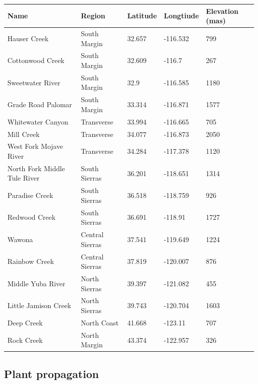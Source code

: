 \documentclass[11pt, oneside]{article}
\begin{document}
\begin{table}[ht]
   \centering
   \begin{tabular}{@{} lllll @{}}
      \toprule
  Name& Region  & Latitude  & Longtiude  & Elevation (mas) \\
      \midrule
	Hauser Creek & South Margin & 32.657	& 
    -116.532	& 799   \\
	Cottonwood Creek	& South Margin & 32.609 & 
    -116.7	& 267   \\
	Sweetwater River	& South Margin & 32.9 & 
    -116.585	& 1180   \\
	Grade Road Palomar & South Margin & 33.314 &
    -116.871	& 1577   \\
	Whitewater Canyon &	Transverse & 33.994 & 
    -116.665	& 705   \\
	Mill Creek	& Transverse & 34.077 & 
    -116.873	& 2050   \\
	West Fork Mojave River	& Transverse & 34.284 & 
    -117.378	& 1120   \\
	North Fork Middle Tule River	& South Sierras & 36.201 & 
    -118.651	& 1314   \\
	Paradise Creek	& South Sierras & 36.518 & 
    -118.759	& 926   \\
	Redwood Creek	& South Sierras & 36.691 & 
    -118.91	& 1727   \\
	Wawona  & Central Sierras & 37.541 & 
    -119.649	& 1224   \\
	Rainbow Creek	& Central Sierras	& 37.819 & 
    -120.007	& 876   \\
	Middle Yuba River	& North Sierras	& 39.397 & 
    -121.082	& 455   \\
	Little Jamison Creek	& North Sierras	& 39.743 & 
    -120.704	& 1603   \\
	Deep Creek	& North Coast & 41.668 & 
    -123.11	& 707   \\
	Rock Creek	& North Margin & 43.374 & 
    -122.957	& 326   \\
	\bottomrule
	\end{tabular}
	\label{table:Table_FocalPops}
\end{table}

\subsection*{Plant propagation}
\end{document}
